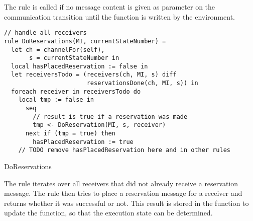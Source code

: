The  rule is called if no message content is
given as parameter on the communication transition until the 
function is written by the environment.





\begin{listing}[H]
\begin{verbatim}
// handle all receivers
rule DoReservations(MI, currentStateNumber) =
  let ch = channelFor(self),
       s = currentStateNumber in
  local hasPlacedReservation := false in
  let receiversTodo = (receivers(ch, MI, s) diff
                       reservationsDone(ch, MI, s)) in
  foreach receiver in receiversTodo do
    local tmp := false in
      seq
        // result is true if a reservation was made
        tmp <- DoReservation(MI, s, receiver)
      next if (tmp = true) then
        hasPlacedReservation := true
    // TODO remove hasPlacedReservation here and in other rules
\end{verbatim}
\caption{DoReservations}
\label{lst:shortasm:DoReservations}
\end{listing}



The  rule iterates over all receivers that did not
already receive a reservation message. The  rule
then tries to place a reservation message for a receiver and returns whether
it was successful or not. This result is stored in the
 function to update the
 function, so that the execution state
can be determined.


